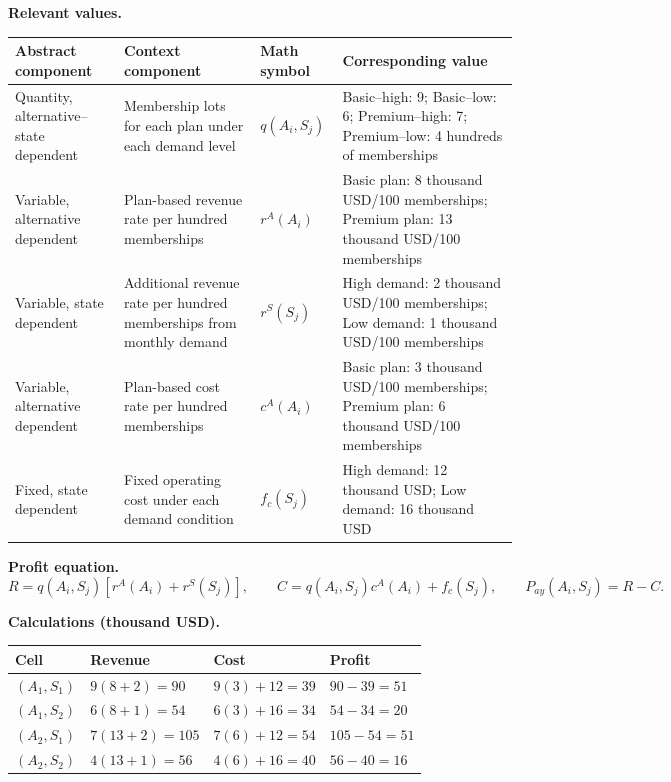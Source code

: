 {		\textbf{Relevant values.}
		\begin{center}
			\small
			\begin{tabularx}{\textwidth}{
					>{\raggedright\arraybackslash}X
					>{\raggedright\arraybackslash}X
					>{\centering\arraybackslash}p{}
					>{\raggedright\arraybackslash}X
				}
				\toprule
				Abstract component & Context component & Math symbol & Corresponding value \\
				\midrule
				Quantity, alternative--state dependent
				& Membership lots for each plan under each demand level
				& $q(A_i,S_j)$
				& Basic--high: 9; Basic--low: 6; Premium--high: 7; Premium--low: 4 hundreds of memberships \\
				Variable, alternative dependent
				& Plan-based revenue rate per hundred memberships
				& $r^A(A_i)$
				& Basic plan: 8 thousand USD/100 memberships; Premium plan: 13 thousand USD/100 memberships \\
				Variable, state dependent
				& Additional revenue rate per hundred memberships from monthly demand
				& $r^S(S_j)$
				& High demand: 2 thousand USD/100 memberships; Low demand: 1 thousand USD/100 memberships \\
				Variable, alternative dependent
				& Plan-based cost rate per hundred memberships
				& $c^A(A_i)$
				& Basic plan: 3 thousand USD/100 memberships; Premium plan: 6 thousand USD/100 memberships \\
				Fixed, state dependent
				& Fixed operating cost under each demand condition
				& $f_c(S_j)$
				& High demand: 12 thousand USD; Low demand: 16 thousand USD \\
				\bottomrule
			\end{tabularx}
		\end{center}
		
		\textbf{Profit equation.}
		\[
		R=q(A_i,S_j)\left[r^A(A_i)+r^S(S_j)\right],
		\qquad
		C=q(A_i,S_j)c^A(A_i)+f_c(S_j),
		\qquad
		P_{ay}(A_i,S_j)=R-C.
		\]
		
		\textbf{Calculations (thousand USD).}
		\begin{center}
			\small
			\begin{tabularx}{\textwidth}{
					>{\raggedright\arraybackslash}X
					>{\centering\arraybackslash}X
					>{\centering\arraybackslash}X
					>{\centering\arraybackslash}X
				}
				\toprule
				Cell & Revenue & Cost & Profit \\
				\midrule
				$(A_1,S_1)$ & $9(8+2)=90$ & $9(3)+12=39$ & $90-39=51$ \\
				$(A_1,S_2)$ & $6(8+1)=54$ & $6(3)+16=34$ & $54-34=20$ \\
				$(A_2,S_1)$ & $7(13+2)=105$ & $7(6)+12=54$ & $105-54=51$ \\
				$(A_2,S_2)$ & $4(13+1)=56$ & $4(6)+16=40$ & $56-40=16$ \\
				\bottomrule
			\end{tabularx}
		\end{center}
		
}
